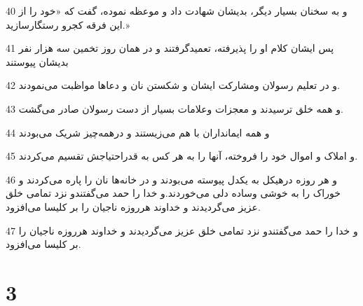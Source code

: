 \par 40 و به سخنان بسیار دیگر، بدیشان شهادت داد و موعظه نموده، گفت که «خود را از این فرقه کجرو رستگارسازید.»
\par 41 پس ایشان کلام او را پذیرفته، تعمیدگرفتند و در همان روز تخمین سه هزار نفر بدیشان پیوستند
\par 42 و در تعلیم رسولان ومشارکت ایشان و شکستن نان و دعاها مواظبت می‌نمودند.
\par 43 و همه خلق ترسیدند و معجزات وعلامات بسیار از دست رسولان صادر می‌گشت.
\par 44 و همه ایمانداران با هم می‌زیستند و درهمه‌چیز شریک می‌بودند
\par 45 و املاک و اموال خود را فروخته، آنها را به هر کس به قدراحتیاجش تقسیم می‌کردند.
\par 46 و هر روزه درهیکل به یکدل پیوسته می‌بودند و در خانه‌ها نان را پاره می‌کردند و خوراک را به خوشی وساده دلی می‌خوردند.و خدا را حمد می‌گفتندو نزد تمامی خلق عزیز می‌گردیدند و خداوند هرروزه ناجیان را بر کلیسا می‌افزود.
\par 47 و خدا را حمد می‌گفتندو نزد تمامی خلق عزیز می‌گردیدند و خداوند هرروزه ناجیان را بر کلیسا می‌افزود.

\chapter{3}

